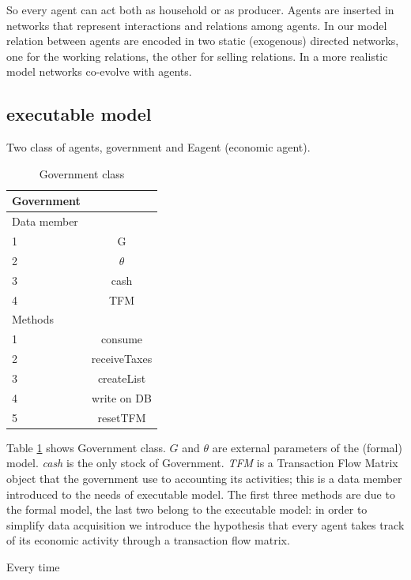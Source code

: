 \documentclass[10pt,a4paper]{article}
\begin{document}
So every agent can act both as household or as producer. Agents are inserted in networks that represent interactions and relations among agents. In our model relation between agents are encoded in two static (exogenous) directed networks, one for the working relations, the other for selling relations. In a more realistic model networks co-evolve with agents. 


\subsection{executable model}
Two class of agents, government and Eagent (economic agent).

\begin{table}[h]
\centering
\begin{tabular}{lc}
\toprule
\textbf{Government}  & \\
\midrule
Data member & \\
\midrule
1 & G \\
2 & $\theta$ \\
3 &cash \\
4 & TFM \\
\midrule
Methods & \\
\midrule
1 & consume \\
2 & receiveTaxes\\
3 & createList\\
4 & write on DB\\
5 & resetTFM\\
\bottomrule
\end{tabular}
\caption{Government class}
\label{GovClass}
\end{table}

Table \ref{GovClass} shows Government class. $G$ and $\theta$ are external parameters of the (formal) model. \emph{cash} is the only stock of Government. \emph{TFM} is a Transaction Flow Matrix object that the government use to accounting its activities; this is a data member introduced to the needs of executable model. The first three methods are due to the formal model, the last two belong to the executable model: in order to simplify data acquisition we introduce the hypothesis that every agent takes track of its economic activity through a transaction flow matrix.

Every time 
\end{document}
